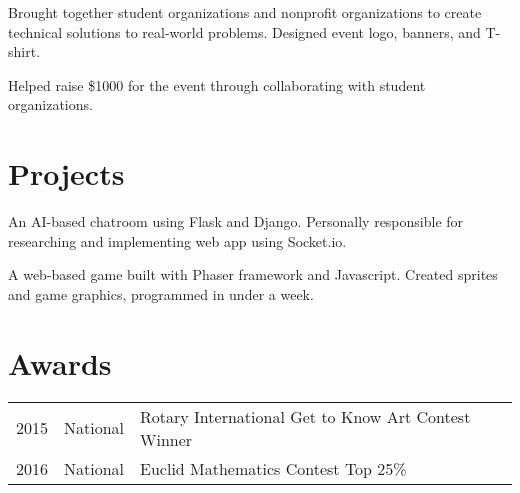\documentclass[]{deedy-resume-openfont}
\begin{document}
\begin{minipage}[t]{0.66\textwidth}
\begin{tightemize}
\item Brought together student organizations and nonprofit organizations to create technical solutions to real-world problems. Designed event logo, banners, and T-shirt.
\item Helped raise \$1000 for the event through collaborating with student organizations.
\end{tightemize}
\sectionsep


\section{Projects}
An AI-based chatroom using Flask and Django. Personally responsible for researching and implementing web app using Socket.io.
\sectionsep

\location{}
A web-based game built with Phaser framework and Javascript. Created sprites and game graphics, programmed in under a week.
\sectionsep


\section{Awards} 
\begin{tabular}{rll}
2015	     & National & Rotary International Get to Know Art Contest Winner\\
2016	     & National & Euclid Mathematics Contest Top 25\%\\
\end{tabular}
\sectionsep


\end{minipage} 
\end{document}
